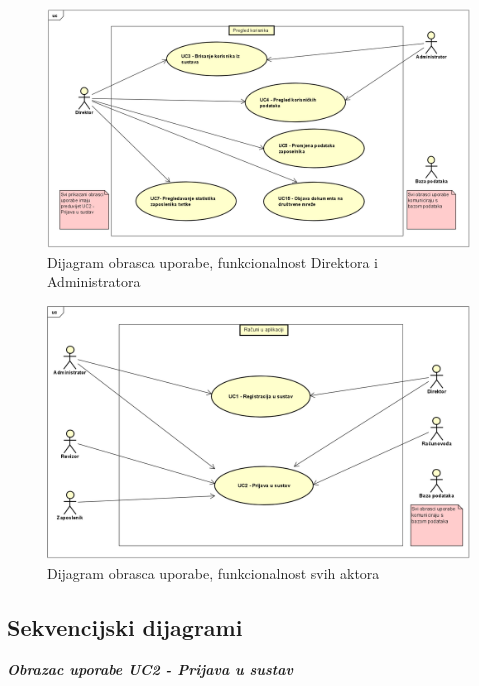 					\begin{figure}[H]
						\includegraphics[width=\textwidth]{slike/3.1.1 dijagrami/PregledKorisnika.PNG}
						\caption{Dijagram obrasca uporabe, funkcionalnost Direktora i Administratora}
						\label{fig:UC21} 
					\end{figure}
					
					\begin{figure}[H]
						\includegraphics[width=\textwidth]{slike/3.1.1 dijagrami/RačuniUAplikaciji.PNG}
						\caption{Dijagram obrasca uporabe, funkcionalnost svih aktora}
						\label{fig:UC21} 
					\end{figure}
					
				\eject		
				
			\subsection{Sekvencijski dijagrami}
				
				\textbf{\textit{Obrazac uporabe UC2 - Prijava u sustav}}\\
				
